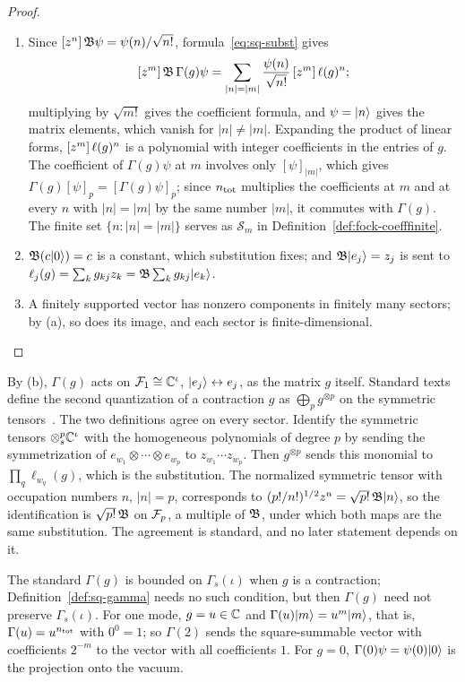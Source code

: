 \begin{vetdenv}
\begin{proof}
\begin{enumerate}
\item[(a)] Since $[z^{n}]\,\mathfrak B\psi=\psi(n)/\sqrt{n!}$, formula~\eqref{eq:sq-subst} gives
\[
 [z^{m}]\,\mathfrak B\,\Gamma(g)\psi=\sum_{\lvert n\rvert=\lvert m\rvert}\frac{\psi(n)}{\sqrt{n!}}\,[z^{m}]\,\ell(g)^n;
\]
multiplying by $\sqrt{m!}$ gives the coefficient formula, and $\psi=\lvert n\rangle$ gives the matrix elements, which vanish
for $\lvert n\rvert\ne\lvert m\rvert$. Expanding the product of linear forms, $[z^{m}]\,\ell(g)^n$ is a polynomial
with integer coefficients in the entries of $g$. The coefficient of $\Gamma(g)\psi$ at $m$ involves only
$[\psi]_{\lvert m\rvert}$, which gives $\Gamma(g)[\psi]_p=[\Gamma(g)\psi]_p$; since $n_{\mathrm{tot}}$ multiplies the
coefficients at $m$ and at every $n$ with $\lvert n\rvert=\lvert m\rvert$ by the same number $\lvert m\rvert$, it
commutes with $\Gamma(g)$. The finite set $\{n:\lvert n\rvert=\lvert m\rvert\}$ serves as $\mathcal S_m$ in
Definition~\ref{def:fock-coefffinite}.
\item[(b)] $\mathfrak B(c\lvert 0\rangle)=c$ is a constant, which substitution fixes; and $\mathfrak B\lvert e_j\rangle=z_j$ is sent to
$\ell_j(g)=\sum_kg_{kj}z_k=\mathfrak B\sum_kg_{kj}\lvert e_k\rangle$.
\item[(c)] A finitely supported vector has nonzero components in finitely many sectors; by (a), so does its
image, and each sector is finite-dimensional.\qedhere
\end{enumerate}
\end{proof}

By (b), $\Gamma(g)$ acts on $\mathcal F_1\cong\mathbb C^\iota$, $\lvert e_j\rangle\leftrightarrow e_j$, as the matrix $g$ itself.
Standard texts define the second quantization of a contraction $g$ as $\bigoplus_pg^{\otimes p}$ on the symmetric
tensors~\cite{dg}. The two definitions agree on every sector. Identify the symmetric tensors
$\otimes_s^p\mathbb C^\iota$ with the homogeneous polynomials of degree $p$ by sending the symmetrization of
$e_{w_1}\otimes\cdots\otimes e_{w_p}$ to $z_{w_1}\cdots z_{w_p}$. Then $g^{\otimes p}$ sends this monomial to
$\prod_q\ell_{w_q}(g)$, which is the substitution. The normalized symmetric tensor with occupation numbers $n$,
$\lvert n\rvert=p$, corresponds to $(p!/n!)^{1/2}z^n=\sqrt{p!}\,\mathfrak B\lvert n\rangle$, so the identification is $\sqrt{p!}\,\mathfrak B$ on
$\mathcal F_p$, a multiple of $\mathfrak B$, under which both maps are the same substitution. The agreement is standard, and no
later statement depends on it.

The standard $\Gamma(g)$ is bounded on $\Gamma_s(\iota)$ when $g$ is a contraction; Definition~\ref{def:sq-gamma}
needs no such condition, but then $\Gamma(g)$ need not preserve $\Gamma_s(\iota)$. For one mode, $g=u\in\mathbb C$ and
$\Gamma(u)\lvert m\rangle=u^m\lvert m\rangle$, that is, $\Gamma(u)=u^{n_{\mathrm{tot}}}$ with $0^0=1$; so $\Gamma(2)$ sends the square-summable
vector with coefficients $2^{-m}$ to the vector with all coefficients $1$. For $g=0$, $\Gamma(0)\psi=\psi(0)\lvert 0\rangle$
is the projection onto the vacuum.


\end{vetdenv}
